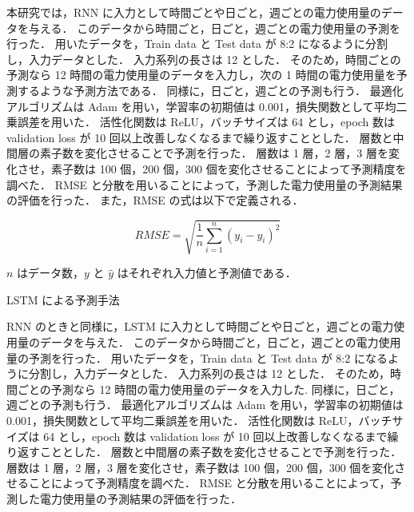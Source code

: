 \documentclass[twocolumn,fleqn,10pt]{jarticle}
\makeatletter
\renewcommand{\subsection}{\@startsection
{subsection}{3}{0mm}{5mm}{0.01pt}{\bfseries \normalsize}}
\makeatother
\begin{document}
本研究では，RNN に入力として時間ごとや日ごと，週ごとの電力使用量のデータを与える．
このデータから時間ごと，日ごと，週ごとの電力使用量の予測を行った．
用いたデータを，Train data と Test data が 8:2 になるように分割し，入力データとした．
入力系列の長さは 12 とした．
そのため，時間ごとの予測なら 12 時間の電力使用量のデータを入力し，次の 1 時間の電力使用量を予測するような予測方法である．
同様に，日ごと，週ごとの予測も行う．
最適化アルゴリズムは Adam を用い，学習率の初期値は 0.001，損失関数として平均二乗誤差を用いた．
活性化関数は ReLU，バッチサイズは 64 とし，epoch 数は validation loss が 10 回以上改善しなくなるまで繰り返すこととした．
層数と中間層の素子数を変化させることで予測を行った．
層数は 1 層，2 層，3 層を変化させ，素子数は 100 個，200 個，300 個を変化させることによって予測精度を調べた．
RMSE と分散を用いることによって，予測した電力使用量の予測結果の評価を行った．
また，RMSE の式は以下で定義される．



\vspace{-4mm}
\begin{equation}
    RMSE = \sqrt{\frac{1}{n} \sum_{i=1}^{n}(y_i - \hat{y_i})^2}
\end{equation}



$n$ はデータ数，$y$ と $\hat{y}$ はそれぞれ入力値と予測値である．











\subsection{LSTM による予測手法}

RNN のときと同様に，LSTM に入力として時間ごとや日ごと，週ごとの電力使用量のデータを与えた．
このデータから時間ごと，日ごと，週ごとの電力使用量の予測を行った．
用いたデータを，Train data と Test data が 8:2 になるように分割し，入力データとした．
入力系列の長さは 12 とした．
そのため，時間ごとの予測なら 12 時間の電力使用量のデータを入力した.
同様に，日ごと，週ごとの予測も行う．
最適化アルゴリズムは Adam を用い，学習率の初期値は 0.001，損失関数として平均二乗誤差を用いた．
活性化関数は ReLU，バッチサイズは 64 とし，epoch 数は validation loss が 10 回以上改善しなくなるまで繰り返すこととした．
層数と中間層の素子数を変化させることで予測を行った．
層数は 1 層，2 層，3 層を変化させ，素子数は 100 個，200 個，300 個を変化させることによって予測精度を調べた．
RMSE と分散を用いることによって，予測した電力使用量の予測結果の評価を行った．
\end{document}
